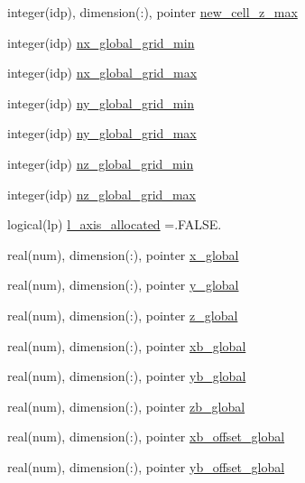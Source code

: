 \begin{DoxyCompactItemize}
\item 
integer(idp), dimension(\+:), pointer \hyperlink{namespaceshared__data_af651b235568738333e3da34d9bf45e3e}{new\+\_\+cell\+\_\+z\+\_\+max}
\item 
integer(idp) \hyperlink{namespaceshared__data_ac7d2abcd22e1c66dd8219334bfd59d32}{nx\+\_\+global\+\_\+grid\+\_\+min}
\item 
integer(idp) \hyperlink{namespaceshared__data_a038972078d665e998a4c47bb38b27170}{nx\+\_\+global\+\_\+grid\+\_\+max}
\item 
integer(idp) \hyperlink{namespaceshared__data_af8ebf934517535333be7a1c20d2acdac}{ny\+\_\+global\+\_\+grid\+\_\+min}
\item 
integer(idp) \hyperlink{namespaceshared__data_ae3340a961cc80b190f3f94eca4f70720}{ny\+\_\+global\+\_\+grid\+\_\+max}
\item 
integer(idp) \hyperlink{namespaceshared__data_a4d4e8b153ff11b729a93959b3cbb94ab}{nz\+\_\+global\+\_\+grid\+\_\+min}
\item 
integer(idp) \hyperlink{namespaceshared__data_ad91a511266f2d05cfcdff8f7dc585e52}{nz\+\_\+global\+\_\+grid\+\_\+max}
\item 
logical(lp) \hyperlink{namespaceshared__data_a18ba8eba764d429843bd89846c59bea9}{l\+\_\+axis\+\_\+allocated} =.F\+A\+L\+S\+E.
\item 
real(num), dimension(\+:), pointer \hyperlink{namespaceshared__data_a103bc2f0564094768f3a34476b371d3a}{x\+\_\+global}
\item 
real(num), dimension(\+:), pointer \hyperlink{namespaceshared__data_a983366c15907d7a58fe04de8a618aa7f}{y\+\_\+global}
\item 
real(num), dimension(\+:), pointer \hyperlink{namespaceshared__data_a560ccdd90913c790de3698e6caa6ed8b}{z\+\_\+global}
\item 
real(num), dimension(\+:), pointer \hyperlink{namespaceshared__data_a22e4d784058444556c04be431d584ec7}{xb\+\_\+global}
\item 
real(num), dimension(\+:), pointer \hyperlink{namespaceshared__data_a5c47105c9e91eee415dcf5d99f2feffc}{yb\+\_\+global}
\item 
real(num), dimension(\+:), pointer \hyperlink{namespaceshared__data_afd2142e5ba5165c1826ad1826cb061e3}{zb\+\_\+global}
\item 
real(num), dimension(\+:), pointer \hyperlink{namespaceshared__data_a5fe1885535a9b60b53e19525797f551a}{xb\+\_\+offset\+\_\+global}
\item 
real(num), dimension(\+:), pointer \hyperlink{namespaceshared__data_a73076ccf0db0fc2938cfb670ead8e284}{yb\+\_\+offset\+\_\+global}

\end{DoxyCompactItemize}
